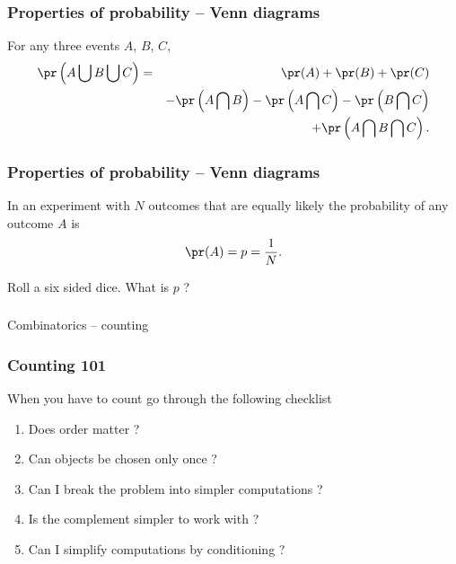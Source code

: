\begin{frame}[fragile]\frametitle{Properties of probability -- Venn diagrams}

For any three events $A$, $B$, $C$,
\begin{eqnarray*}
\pr \left(A \bigcup B  \bigcup C \right) &= &\pr(A) +\pr(B)+ \pr(C)\\
& & - \pr \left(A \bigcap B\right)- \pr\left(A \bigcap C \right) - \pr\left(B
  \bigcap C \right)\\
& & + \pr\left(A \bigcap B \bigcap C \right).
\end{eqnarray*}
\end{frame}

\begin{frame}[fragile]\frametitle{Properties of probability -- Venn diagrams}

In an experiment with $N$ outcomes that are equally likely the 
probability of any outcome $A$ is 
$$\pr(A) = p = \frac{1}{N}.$$  

\vspace{.2in}

Roll a six sided dice. What is $p$ ?
\end{frame}

\begin{frame}[fragile]\frametitle{}
\begin{center}
{\Large Combinatorics -- counting}

\end{center}
\end{frame}



\begin{frame}[fragile]\frametitle{Counting 101}

When you have to count go through the following checklist 

\begin{enumerate}

\item Does order matter ? 

\item Can objects be chosen only once ? 

\item Can I break the problem into simpler computations ? 

\item Is the complement simpler to work with ? 
 
\item Can I simplify computations by conditioning ? 

\end{enumerate}

\end{frame}

